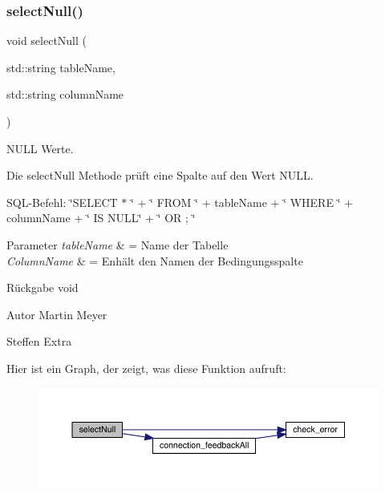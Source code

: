 \subsubsection{select\+Null()}
{\footnotesize\ttfamily void select\+Null (\begin{DoxyParamCaption}\item[{std\+::string}]{table\+Name,  }\item[{std\+::string}]{column\+Name }\end{DoxyParamCaption})}



N\+U\+LL Werte. 

Die select\+Null Methode prüft eine Spalte auf den Wert N\+U\+LL.~\newline


S\+Q\+L-\/\+Befehl\+: \char`\"{}\+S\+E\+L\+E\+C\+T $\ast$ \char`\"{} + \char`\"{} F\+R\+O\+M \char`\"{} + table\+Name + \char`\"{} W\+H\+E\+R\+E \char`\"{} + column\+Name + \char`\"{} I\+S N\+U\+L\+L\char`\"{} + \char`\"{} O\+R \textquotesingle{} \textquotesingle{}; \char`\"{}


\begin{DoxyParams}{Parameter}
{\em table\+Name} & = Name der Tabelle \\
\hline
{\em Column\+Name} & = Enhält den Namen der Bedingungsspalte\\
\hline
\end{DoxyParams}
\begin{DoxyReturn}{Rückgabe}
void
\end{DoxyReturn}
\begin{DoxyAuthor}{Autor}
Martin Meyer 

Steffen Extra 
\end{DoxyAuthor}
Hier ist ein Graph, der zeigt, was diese Funktion aufruft\+:\nopagebreak
\begin{figure}[H]
\begin{center}
\leavevmode
\includegraphics[width=350pt]{selection_request_8cpp_aedcd1503abb6715de26a92d34714dcce_cgraph}
\end{center}
\end{figure}
\mbox{\label{selection_request_8cpp_aff2cca0ae3f40a8b3ec70e85702bb8fc}} 
